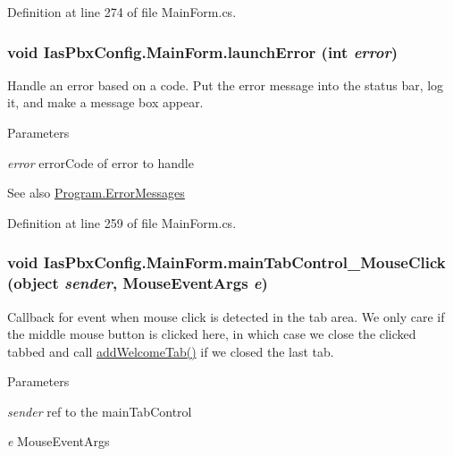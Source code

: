Definition at line 274 of file MainForm.cs.\hypertarget{class_ias_pbx_config_1_1_main_form_a4e7a709ee9db70a8263097fe2541266d}{
\subsubsection[{launchError}]{\setlength{\rightskip}{0pt plus 5cm}void IasPbxConfig.MainForm.launchError (int {\em error})}}
\label{class_ias_pbx_config_1_1_main_form_a4e7a709ee9db70a8263097fe2541266d}


Handle an error based on a code. Put the error message into the status bar, log it, and make a message box appear. 
\begin{DoxyParams}{Parameters}
\item[{\em error}]errorCode of error to handle \end{DoxyParams}
\begin{DoxySeeAlso}{See also}
\hyperlink{class_ias_pbx_config_1_1_program_a914e91efe69f6c3856d81120624ba66d}{Program.ErrorMessages} 
\end{DoxySeeAlso}


Definition at line 259 of file MainForm.cs.\hypertarget{class_ias_pbx_config_1_1_main_form_a3b34ad5c46cb2005f92d87544f5d6a0d}{
\subsubsection[{mainTabControl\_\-MouseClick}]{\setlength{\rightskip}{0pt plus 5cm}void IasPbxConfig.MainForm.mainTabControl\_\-MouseClick (object {\em sender}, \/  MouseEventArgs {\em e})}}
\label{class_ias_pbx_config_1_1_main_form_a3b34ad5c46cb2005f92d87544f5d6a0d}


Callback for event when mouse click is detected in the tab area. We only care if the middle mouse button is clicked here, in which case we close the clicked tabbed and call \hyperlink{class_ias_pbx_config_1_1_main_form_ae464d50243315dc81ede782996ae3258}{addWelcomeTab()} if we closed the last tab. 
\begin{DoxyParams}{Parameters}
\item[{\em sender}]ref to the mainTabControl \item[{\em e}]MouseEventArgs \end{DoxyParams}


